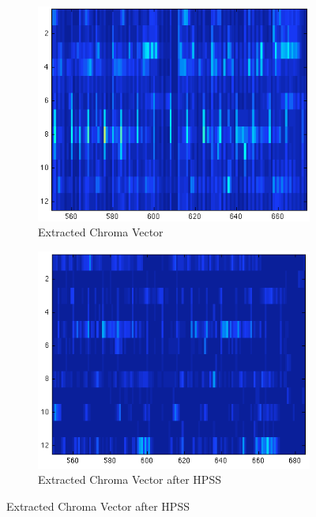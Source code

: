 \documentclass{article}
\begin{document}
\begin{figure}
	\centering
    \begin{subfigure}[b]{0.47\textwidth}
        \includegraphics[width=\textwidth]{187.png}
        \caption{Extracted Chroma Vector}\label{fig:ChromaNorm}
    \end{subfigure}
    \begin{subfigure}[b]{0.47\textwidth}
        \includegraphics[width=\textwidth]{187h.png}
        \caption{Extracted Chroma Vector after HPSS}\label{fig:ChromaHPSS}
    \end{subfigure}
\end{figure}
\end{document}

